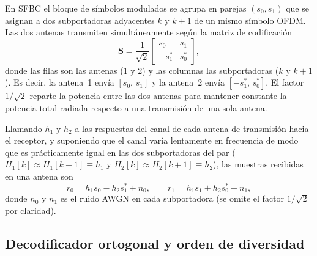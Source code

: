 \documentclass[conference,onecolumn]{IEEEtran}
\begin{document}
En SFBC el bloque de s\'imbolos modulados se agrupa en parejas $(s_0,s_1)$ que se asignan a dos subportadoras adyacentes $k$ y $k{+}1$ de un mismo s\'imbolo OFDM. Las dos antenas transmiten simult\'aneamente seg\'un la matriz de codificaci\'on
\begin{equation}
\mathbf{S}=\frac{1}{\sqrt{2}}
\begin{bmatrix} s_0 & s_1 \\[2pt] -s_1^{*} & s_0^{*} \end{bmatrix},
\label{eq:matriz}
\end{equation}
donde las filas son las antenas (1 y 2) y las columnas las subportadoras ($k$ y $k{+}1$). Es decir, la antena~1 env\'ia $[s_0,\,s_1]$ y la antena~2 env\'ia $[-s_1^{*},\,s_0^{*}]$. El factor $1/\sqrt{2}$ reparte la potencia entre las dos antenas para mantener constante la potencia total radiada respecto a una transmisi\'on de una sola antena.

Llamando $h_1$ y $h_2$ a las respuestas del canal de cada antena de transmisi\'on hacia el receptor, y suponiendo que el canal var\'ia lentamente en frecuencia de modo que es pr\'acticamente igual en las dos subportadoras del par ($H_1[k]\!\approx\!H_1[k{+}1]\!\equiv\!h_1$ y $H_2[k]\!\approx\!H_2[k{+}1]\!\equiv\!h_2$), las muestras recibidas en una antena son
\begin{equation}
r_0 = h_1 s_0 - h_2 s_1^{*} + n_0, \qquad
r_1 = h_1 s_1 + h_2 s_0^{*} + n_1,
\label{eq:recibido}
\end{equation}
donde $n_0$ y $n_1$ es el ruido AWGN en cada subportadora (se omite el factor $1/\sqrt{2}$ por claridad).

\subsection{Decodificador ortogonal y orden de diversidad}
\end{document}
